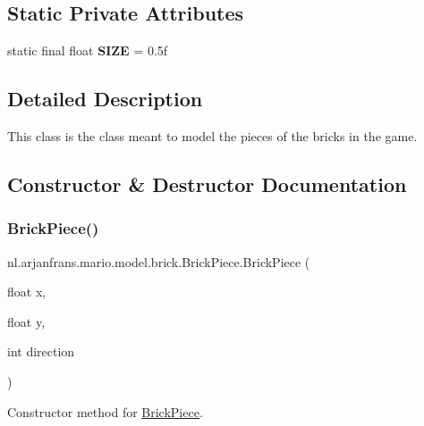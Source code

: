 \subsection*{Static Private Attributes}
\begin{DoxyCompactItemize}
\item 
\mbox{\label{classnl_1_1arjanfrans_1_1mario_1_1model_1_1brick_1_1BrickPiece_a44b4e84228313d00cda8943ddf8cc04b}} 
static final float {\bfseries S\+I\+ZE} = 0.\+5f
\end{DoxyCompactItemize}


\subsection{Detailed Description}
This class is the class meant to model the pieces of the bricks in the game. 

\subsection{Constructor \& Destructor Documentation}
\mbox{\label{classnl_1_1arjanfrans_1_1mario_1_1model_1_1brick_1_1BrickPiece_adb0ed3d619092f6f60661039261e6c2d}} 
\subsubsection{\texorpdfstring{Brick\+Piece()}{BrickPiece()}}
{\footnotesize\ttfamily nl.\+arjanfrans.\+mario.\+model.\+brick.\+Brick\+Piece.\+Brick\+Piece (\begin{DoxyParamCaption}\item[{float}]{x,  }\item[{float}]{y,  }\item[{int}]{direction }\end{DoxyParamCaption})}



Constructor method for \hyperlink{classnl_1_1arjanfrans_1_1mario_1_1model_1_1brick_1_1BrickPiece}{Brick\+Piece}. 


